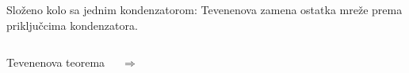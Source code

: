 \begin{frame}[label=08-s046]
Složeno kolo sa jednim kondenzatorom: Tevenenova zamena ostatka mreže prema priključcima kondenzatora.\par\bigskip
\begin{columns}[c,onlytextwidth]\centering
{}\centering\gusttekst Tevenenova teorema\par{\LARGE$\Longrightarrow$}
\centering\end{columns}
\end{frame}
